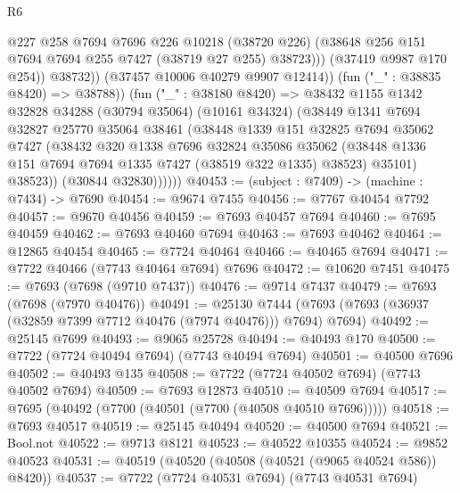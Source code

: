 \begin{lexlean}{R6}
\begin{coremodule}
                          @227
                          @258
                          @7694
                          @7696
                          @226
                          @10218
                          (@38720 @226)
                          (@38648 @256 @151 @7694 @7694 @255 @7427 (@38719 @27 @255) @38723)))
                      (@37419 @9987 @170 @254))
                    @38732))
                (@37457 @10006 @40279 @9907 @12414))
              (fun ("_" : @38835 @8420) => @38788))
            (fun ("_" : @38180 @8420) =>
            @38432
              @1155
              @1342
              @32828
              @34288
              (@30794 @35064)
              (@10161 @34324)
              (@38449
                @1341
                @7694
                @32827
                @25770
                @35064
                @38461
                (@38448
                  @1339
                  @151
                  @32825
                  @7694
                  @35062
                  @7427
                  (@38432
                    @320
                    @1338
                    @7696
                    @32824
                    @35086
                    @35062
                    (@38448 @1336 @151 @7694 @7694 @1335 @7427 (@38519 @322 @1335) @38523)
                    @35101)
                  @38523))
              (@30844 @32830))))))
@40453 := (subject : @7409) -> (machine : @7434) -> @7690
@40454 := @9674 @7455
@40456 := @7767 @40454 @7792
@40457 := @9670 @40456
@40459 := @7693 @40457 @7694
@40460 := @7695 @40459
@40462 := @7693 @40460 @7694
@40463 := @7693 @40462
@40464 := @12865 @40454
@40465 := @7724 @40464
@40466 := @40465 @7694
@40471 := @7722 @40466 (@7743 @40464 @7694) @7696
@40472 := @10620 @7451
@40475 := @7693 (@7698 (@9710 @7437))
@40476 := @9714 @7437
@40479 := @7693 (@7698 (@7970 @40476))
@40491 := @25130
    @7444
    (@7693 (@7693 (@36937 (@32859 @7399 @7712 @40476 (@7974 @40476))) @7694) @7694)
@40492 := @25145 @7699
@40493 := @9065 @25728
@40494 := @40493 @170
@40500 := @7722 (@7724 @40494 @7694) (@7743 @40494 @7694)
@40501 := @40500 @7696
@40502 := @40493 @135
@40508 := @7722 (@7724 @40502 @7694) (@7743 @40502 @7694)
@40509 := @7693 @12873
@40510 := @40509 @7694
@40517 := @7695 (@40492 (@7700 (@40501 (@7700 (@40508 @40510 @7696)))))
@40518 := @7693 @40517
@40519 := @25145 @40494
@40520 := @40500 @7694
@40521 := Bool.not
@40522 := @9713 @8121
@40523 := @40522 @10355
@40524 := @9852 @40523
@40531 := @40519 (@40520 (@40508 (@40521 (@9065 @40524 @586)) @8420))
@40537 := @7722 (@7724 @40531 @7694) (@7743 @40531 @7694)

\end{coremodule}
\end{lexlean}
